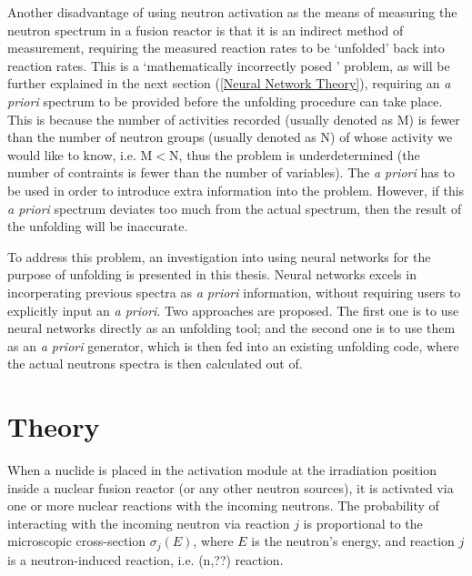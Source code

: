\documentclass[a4paper, 12pt]{article}
\begin{document}
Another disadvantage of using neutron activation as the means of measuring the neutron spectrum in a fusion reactor is that it is an indirect method of measurement, requiring the measured reaction rates to be `unfolded' back into reaction rates. This is a `mathematically incorrectly posed ' problem\cite{BirminghamUnfolding}, as will be further explained in the next section (\ref{Neural Network Theory}), requiring an \emph{a priori} spectrum to be provided before the unfolding procedure can take place. This is because the number of activities recorded (usually denoted as M) is fewer than the number of neutron groups (usually denoted as N) of whose activity we would like to know, i.e. M$<$N, thus the problem is underdetermined (the number of contraints is fewer than the number of variables). The \emph{a priori} has to be used in order to introduce extra information into the problem. However, if this \emph{a priori} spectrum deviates too much from the actual spectrum, then the result of the unfolding will be inaccurate.

To address this problem, an investigation into using neural networks for the purpose of unfolding is presented in this thesis.
Neural networks excels in incorperating previous spectra as \emph{a priori} information, without requiring users to explicitly input an \emph{a priori}.
Two approaches are proposed. The first one is to use neural networks directly as an unfolding tool; and the second one is to use them as an \emph{a priori} generator, which is then fed into an existing unfolding code, where the actual neutrons spectra is then calculated out of.

\section{Theory}
When a nuclide is placed in the activation module at the irradiation position inside a nuclear fusion reactor (or any other neutron sources), it is activated via one or more nuclear reactions with the incoming neutrons. The probability of interacting with the incoming neutron via reaction $j$ is proportional to the microscopic cross-section $\sigma_j (E)$, where $E$ is the neutron's energy, and reaction $j$ is a neutron-induced reaction, i.e. (n,??) reaction.

\end{document}

